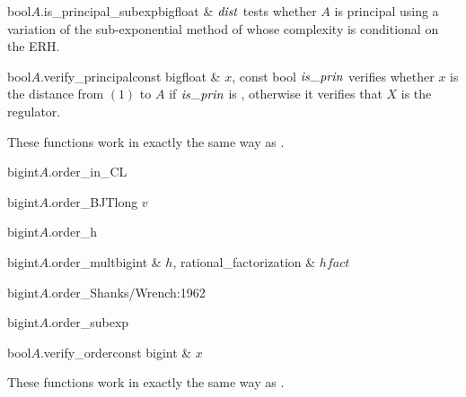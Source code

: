 \begin{cfcode}{bool}{$A$.is_principal_subexp}{bigfloat & $\mathit{dist}$}
  tests whether $A$ is principal using a variation of the sub-exponential method of
  \cite{Jacobson_Thesis:1999} whose complexity is conditional on the ERH.
\end{cfcode}

\begin{cfcode}{bool}{$A$.verify_principal}{const bigfloat & $x$, const bool $\isprin$}
  verifies whether $x$ is the distance from $(1)$ to $A$ if $\isprin$ is \TRUE, otherwise it
  verifies that $X$ is the regulator.
\end{cfcode}




These functions work in exactly the same way as .

\begin{cfcode}{bigint}{$A$.order_in_CL}{}
\end{cfcode}

\begin{cfcode}{bigint}{$A$.order_BJT}{long $v$}
\end{cfcode}

\begin{cfcode}{bigint}{$A$.order_h}{}
\end{cfcode}

\begin{cfcode}{bigint}{$A$.order_mult}{bigint & $h$, rational_factorization & $hfact$}
\end{cfcode}

\begin{cfcode}{bigint}{$A$.order_Shanks/Wrench:1962}{}
\end{cfcode}

\begin{cfcode}{bigint}{$A$.order_subexp}{}
\end{cfcode}

\begin{cfcode}{bool}{$A$.verify_order}{const bigint & $x$}
\end{cfcode}




These functions work in exactly the same way as .

